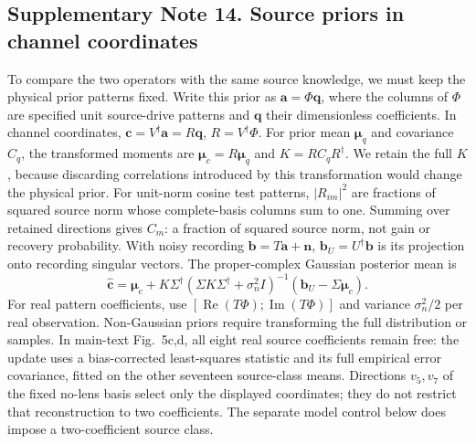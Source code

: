 \documentclass[pdflatex,sn-nature]{sn-jnl}%
\begin{document}
\subsection*{Supplementary Note 14. Source priors in channel coordinates}

To compare the two operators with the same source knowledge, we must keep the physical prior patterns fixed. Write this prior as $\bm a=\Phi\bm q$, where the
columns of $\Phi$ are specified unit source-drive patterns and $\bm q$
their dimensionless coefficients. In channel coordinates,
$\bm c=V^\dagger\bm a=R\bm q$, $R=V^\dagger\Phi$.
For prior mean $\bm\mu_q$ and covariance $C_q$, the transformed moments are
$\bm\mu_c=R\bm\mu_q$ and $K=RC_qR^\dagger$.
We retain the full $K$, because discarding correlations introduced by this transformation would change the physical prior.
For unit-norm cosine test patterns, $|R_{im}|^2$ are fractions of
squared source norm whose complete-basis columns sum to one.
Summing over retained directions gives $C_m$: a fraction of squared source norm, not gain or recovery probability.
With noisy recording $\bm b=T\bm a+\bm n$, $\bm b_U=U^\dagger\bm b$
is its projection onto recording singular vectors. The proper-complex Gaussian posterior mean is
\begin{equation}
 \hat{\bm c}=\bm\mu_c+K\Sigma^\dagger
 (\Sigma K\Sigma^\dagger+\sigma_n^2I)^{-1}
 (\bm b_U-\Sigma\bm\mu_c).
 \label{eq:prior_mean}
\end{equation}
For real pattern coefficients, use $[\operatorname{Re}(T\Phi);\operatorname{Im}(T\Phi)]$ and variance $\sigma_n^2/2$ per real observation. Non-Gaussian priors require transforming the full distribution or samples. In main-text Fig.~5c,d, all eight real source coefficients remain free: the update uses a bias-corrected least-squares statistic and its full empirical error covariance, fitted on the other seventeen source-class means. Directions $v_5,v_7$ of the fixed no-lens basis select only the displayed coordinates; they do not restrict that reconstruction to two coefficients. The separate model control below does impose a two-coefficient source class.
\end{document}
